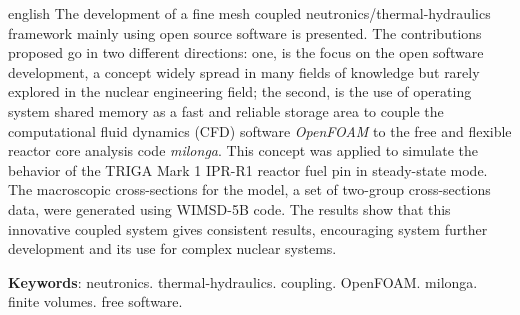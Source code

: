 \documentclass[12pt,openright,twoside,a4paper,english,french,spanish,brazil]{abntex2}
\begin{document}
\begin{resumo}[Abstract]
 \begin{otherlanguage*}{english}
   The development of a fine mesh coupled neutronics/thermal-hydraulics framework mainly using open source software is presented.
   The contributions proposed go in two different directions: one, is the focus on the open software development, a concept
   widely spread in many fields of knowledge but rarely explored in the nuclear engineering field; the second, is the use of operating
   system shared memory as a fast and reliable storage area to couple the computational fluid dynamics (CFD) software \textit{OpenFOAM} to the
   free and flexible reactor core analysis code \textit{milonga}. This concept was applied to simulate the behavior of the TRIGA Mark 1 IPR-R1 reactor
   fuel pin in steady-state mode. The macroscopic cross-sections for the model, a set of two-group cross-sections data, were generated using WIMSD-5B code.
   The results show that this innovative coupled system gives consistent results, encouraging system further development and its use for complex nuclear systems.
   
   \vspace{\onelineskip}
% 
   \noindent 
   \textbf{Keywords}: neutronics. thermal-hydraulics. coupling. OpenFOAM. milonga. finite volumes. free software.
 \end{otherlanguage*}
\end{resumo}

% 
% 

%  
% 
\end{document}
